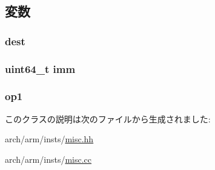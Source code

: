 \subsection{変数}
\hypertarget{classRegRegImmOp_aec72e8e45bdc87abeeeb75d2a8a9a716}{
\subsubsection[{dest}]{ {\bf dest}}}
\label{classRegRegImmOp_aec72e8e45bdc87abeeeb75d2a8a9a716}
\hypertarget{classRegRegImmOp_a2b4406ad2843b5aa12d244d01d8fdc69}{
\subsubsection[{imm}]{\setlength{\rightskip}{0pt plus 5cm}uint64\_\-t {\bf imm}}}
\label{classRegRegImmOp_a2b4406ad2843b5aa12d244d01d8fdc69}
\hypertarget{classRegRegImmOp_a4c465c43ad568f8bcf8ae71480e9cfea}{
\subsubsection[{op1}]{ {\bf op1}}}
\label{classRegRegImmOp_a4c465c43ad568f8bcf8ae71480e9cfea}


このクラスの説明は次のファイルから生成されました:\begin{DoxyCompactItemize}
\item 
arch/arm/insts/\hyperlink{arch_2arm_2insts_2misc_8hh}{misc.hh}\item 
arch/arm/insts/\hyperlink{arch_2arm_2insts_2misc_8cc}{misc.cc}\end{DoxyCompactItemize}
